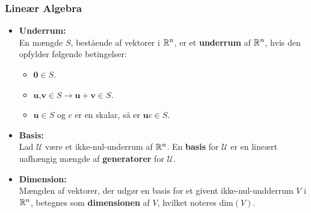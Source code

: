 %
\begin{frame}
\frametitle{Lineær Algebra}
\begin{itemize}
\item \textbf{Underrum: } \\ 
En mængde $S$, bestående af vektorer i $\mathbb{R}^n$, er et \textbf{underrum} af $\mathbb{R}^n$, hvis den opfylder følgende betingelser:	
\begin{itemize}
\item $\textbf{0}\in S$.
\item $\textbf{u}$,$\textbf{v} \in S \rightarrow \textbf{u}+\textbf{v} \in S $.
\item $\textbf{u} \in S$ og $c$ er en skalar, så er $\textbf{u}c \in S$.
\end{itemize}
\item \textbf{Basis: } \\ 
Lad $\mathcal{U}$ være et ikke-nul-underrum af $\mathbb{R}^n$. 
En \textbf{basis} for $\mathcal{U}$ er en lineært uafhængig mængde af \textbf{generatorer} for $\mathcal{U}$. \\ 
\item \textbf{Dimension: } \\ 
Mængden af vektorer, der udgør en basis for et givent ikke-nul-undderrum $V$ i $\mathbb{R}^n$, betegnes som \textbf{dimensionen} af $V$, hvilket noteres $\text{dim}(V)$. 
\end{itemize}
\end{frame}
%
